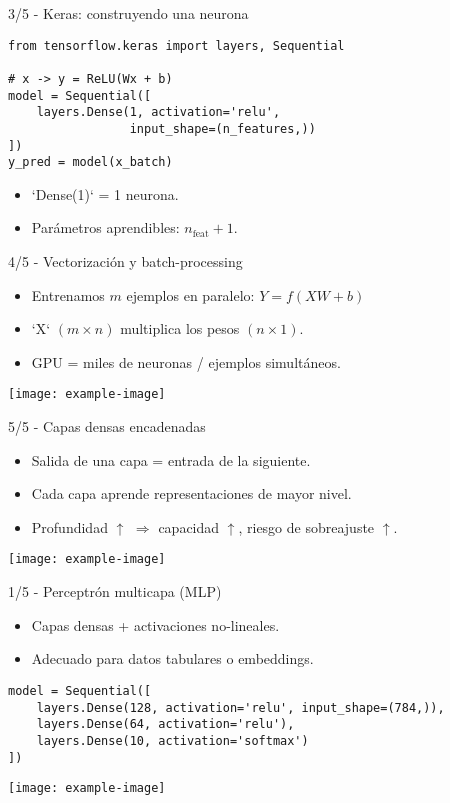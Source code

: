 \documentclass[12pt,spanish]{beamer}
\begin{document}
\begin{frame}[fragile]{3/5  -  Keras: construyendo una neurona}
  \begin{verbatim}
from tensorflow.keras import layers, Sequential

# x -> y = ReLU(Wx + b)
model = Sequential([
    layers.Dense(1, activation='relu',
                 input_shape=(n_features,))
])
y_pred = model(x_batch)
  \end{verbatim}
  \vspace{-1em}
  \begin{itemize}
    \item `Dense(1)` = 1 neurona.
    \item Parámetros aprendibles: \(n_\text{feat}+1\).
  \end{itemize}
\end{frame}

\begin{frame}{4/5  -  Vectorización y batch-processing}
  \begin{itemize}
    \item Entrenamos \(m\) ejemplos en paralelo:
      \(Y = f(XW + b)\)
    \item `X` \((m \times n)\) multiplica los pesos \((n \times 1)\).
    \item GPU = miles de neuronas / ejemplos simultáneos.
  \end{itemize}
  \centering
  \texttt{[image: example-image]}
\end{frame}

\begin{frame}{5/5  -  Capas densas encadenadas}
  \begin{itemize}
    \item Salida de una capa = entrada de la siguiente.
    \item Cada capa aprende representaciones de mayor nivel.
    \item Profundidad \(\uparrow\) \(\Rightarrow\) capacidad \(\uparrow\),
          riesgo de sobreajuste \(\uparrow\).
  \end{itemize}
  \centering
  \texttt{[image: example-image]}
\end{frame}

\begin{frame}{1/5  -  Perceptrón multicapa (MLP)}
  \begin{itemize}
    \item Capas densas + activaciones no-lineales.
    \item Adecuado para datos tabulares o embeddings.
  \end{itemize}
  \begin{verbatim}
model = Sequential([
    layers.Dense(128, activation='relu', input_shape=(784,)),
    layers.Dense(64, activation='relu'),
    layers.Dense(10, activation='softmax')
])
  \end{verbatim}
  \centering
  \texttt{[image: example-image]}
\end{frame}
\end{document}
